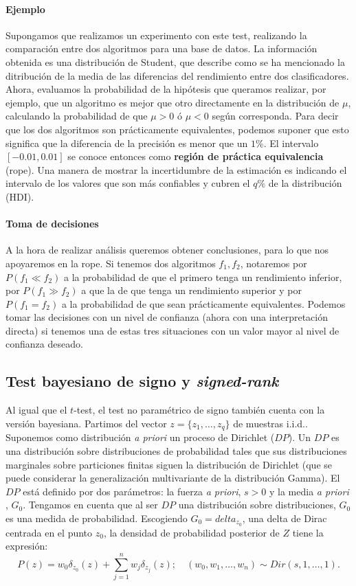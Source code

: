 \paragraph{Ejemplo} Supongamos que realizamos un experimento
con este test, realizando la comparación entre dos algoritmos
para una base de datos. La información obtenida es una 
distribución de Student, que describe como se ha mencionado
la ditribución de la media de las diferencias del rendimiento
entre dos clasificadores. Ahora, evaluamos la probabilidad 
de la hipótesis que queramos realizar, por ejemplo, que un 
algoritmo es mejor que otro directamente en la distribución
de $\mu$, calculando la probabilidad de que $\mu > 0$ ó $\mu 
< 0$ según corresponda. Para decir que los dos algoritmos son
prácticamente equivalentes, podemos suponer que esto 
significa que la diferencia de la precisión es menor que un
$1\%$. El intervalo $[-0.01, 0.01]$ se conoce entonces como
\textbf{región de práctica equivalencia} (rope). Una manera 
de mostrar la incertidumbre de la estimación es indicando el 
intervalo de los valores que son más confiables y cubren el 
$q\%$ de la distribución (HDI). 

\paragraph{Toma de decisiones} A la hora de realizar 
análisis queremos obtener conclusiones, para lo que nos 
apoyaremos en la rope. Si tenemos dos algoritmos $f_1, f_2$, 
notaremos por $P(f_1 \ll f_2)$ a la probabilidad de que el 
primero tenga un rendimiento inferior, por $P(f_1 \gg f_2)$ a 
que la de que tenga un rendimiento superior y por $P(f_1 =
f_2)$ a la probabilidad de que sean prácticamente 
equivalentes. Podemos tomar las decisiones con un nivel
de confianza (ahora con una interpretación directa) si
tenemos una de estas tres situaciones con un valor mayor
al nivel de confianza deseado.

\subsection{Test bayesiano de signo y \textit{signed-rank}}

	Al igual que el $t$-test, el test no paramétrico de 
signo también cuenta con la versión bayesiana. Partimos
del vector $z = \{z_1, \dots, z_q\}$ de muestras i.i.d.. 
Suponemos como distribución \textit{a priori} un proceso
de Dirichlet ($DP$). Un $DP$ es una distribución sobre 
distribuciones de probabilidad tales que sus distribuciones
marginales sobre particiones finitas siguen la distribución
de Dirichlet (que se puede considerar la generalización
multivariante de la distribución Gamma). El $DP$ está
definido por dos parámetros: la fuerza \textit{a priori},
$s>0$ y la media \textit{a priori} , $G_0$. Tengamos en 
cuenta que al ser $DP$ una distribución sobre distribuciones,
$G_0$ es una medida de probabilidad. Escogiendo $G_0 = 
delta_{z_0}$, una delta de Dirac centrada en el punto $z_0$,
la densidad de probabilidad posterior de $Z$ tiene la
expresión:
	\[ P(z) = 
		w_0 \delta_{z_0}(z) +
			\sum\limits_{j=1}^n
				w_j \delta_{z_j}(z); \quad
		(w_0, w_1, \dots, w_n) \sim Dir(s,1, \dots, 1).
	\] 
	
